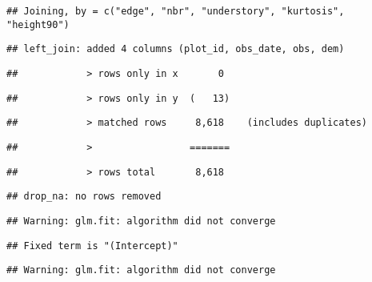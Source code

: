\documentclass[
]{article}
\begin{document}
\begin{verbatim}
## Joining, by = c("edge", "nbr", "understory", "kurtosis", "height90")
\end{verbatim}

\begin{verbatim}
## left_join: added 4 columns (plot_id, obs_date, obs, dem)
\end{verbatim}

\begin{verbatim}
##            > rows only in x       0
\end{verbatim}

\begin{verbatim}
##            > rows only in y  (   13)
\end{verbatim}

\begin{verbatim}
##            > matched rows     8,618    (includes duplicates)
\end{verbatim}

\begin{verbatim}
##            >                 =======
\end{verbatim}

\begin{verbatim}
##            > rows total       8,618
\end{verbatim}

\begin{verbatim}
## drop_na: no rows removed
\end{verbatim}

\begin{verbatim}
## Warning: glm.fit: algorithm did not converge
\end{verbatim}

\begin{verbatim}
## Fixed term is "(Intercept)"
\end{verbatim}

\begin{verbatim}
## Warning: glm.fit: algorithm did not converge
\end{verbatim}
\end{document}
